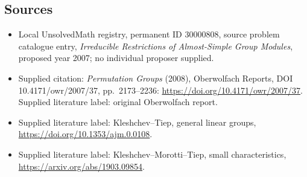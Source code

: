 \documentclass[11pt]{article}
\begin{document}
\subsection{Sources}
\begin{itemize}\item Local UnsolvedMath registry, permanent ID 30000808, source problem catalogue entry, \emph{Irreducible Restrictions of Almost-Simple Group Modules}, proposed year 2007; no individual proposer supplied.\item Supplied citation: \emph{Permutation Groups} (2008), Oberwolfach Reports, DOI 10.4171/owr/2007/37, pp.\ 2173--2236: \url{https://doi.org/10.4171/owr/2007/37}. Supplied literature label: original Oberwolfach report.\item Supplied literature label: Kleshchev--Tiep, general linear groups, \url{https://doi.org/10.1353/ajm.0.0108}.\item Supplied literature label: Kleshchev--Morotti--Tiep, small characteristics, \url{https://arxiv.org/abs/1903.09854}.\end{itemize}
\end{document}
